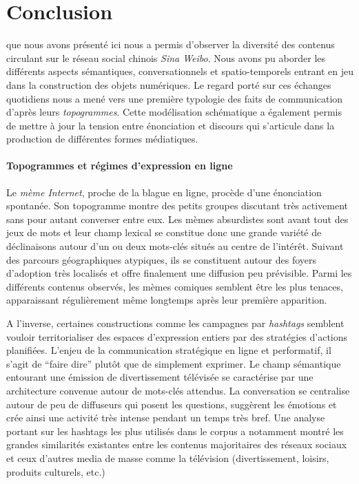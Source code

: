 \chapter*{Conclusion}

 que nous avons présenté ici nous a permis d'observer la diversité des contenus circulant sur le réseau social chinois \textit{Sina Weibo}. Nous avons pu aborder les différents aspects sémantiques, conversationnels et spatio-temporels entrant en jeu dans la construction des objets numériques. Le regard porté sur ces échanges quotidiens nous a mené vers une première typologie des faits de communication d'après leurs \textit{topogrammes}. Cette modélisation schématique a également permis de mettre à jour la tension entre énonciation et discours qui s'articule dans la production de différentes formes médiatiques.

\subsubsection{Topogrammes et régimes d'expression en ligne}
Le \textit{mème Internet}, proche de la blague en ligne, procède d'une énonciation spontanée. Son topogramme montre des petits groupes discutant très activement sans pour autant converser entre eux. Les mèmes absurdistes sont avant tout des jeux de mots et leur champ lexical se constitue donc une grande variété de déclinaisons autour d'un ou deux mots-clés situés au centre de l'intérêt. Suivant des parcours géographiques atypiques, ils se constituent autour des foyers d'adoption très localisés et offre finalement une diffusion peu prévisible. Parmi les différents contenus observés, les mèmes comiques semblent être les plus tenaces, apparaissant régulièrement même longtemps après leur première apparition.

A l'inverse, certaines constructions comme les campagnes par \textit{hashtags} semblent vouloir territorialiser des espaces d'expression entiers par des stratégies d'actions planifiées. L'enjeu de la communication stratégique en ligne et performatif, il s'agit de ``faire dire'' plutôt que de simplement exprimer. Le champ sémantique entourant une émission de divertissement télévisée se caractérise par une architecture convenue autour de mots-clés attendus. La conversation se centralise autour de peu de diffuseurs qui posent les questions, suggèrent les émotions et crée ainsi une activité très intense pendant un temps très bref. Une analyse portant sur les hashtags les plus utilisés dans le corpus a notamment montré les grandes similarités existantes entre les contenus majoritaires des réseaux sociaux et ceux d'autres media de masse comme la télévision (divertissement, loisirs, produits culturels, etc.)

